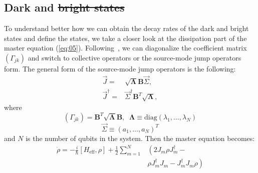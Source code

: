 \documentclass[lettersize,journal]{IEEEtran}
\providecommand{\DIFaddtex}[1]{{\protect\color{blue}\uwave{#1}}} %
\providecommand{\DIFdeltex}[1]{{\protect\color{red}\sout{#1}}}                      %
\providecommand{\DIFaddbegin}{} %
\providecommand{\DIFaddend}{} %
\providecommand{\DIFdelbegin}{} %
\providecommand{\DIFdelend}{} %
\providecommand{\DIFadd}[1]{\texorpdfstring{\DIFaddtex{#1}}{#1}} %
\providecommand{\DIFdel}[1]{\texorpdfstring{\DIFdeltex{#1}}{}} %
\newcommand{\DIFscaledelfig}{0.5}
\newlength{\DIFdelgraphicswidth} %
\newlength{\DIFdelgraphicsheight} %
\newcommand{\DIFaddincludegraphics}[2][]{{\color{blue}\fbox{\DIFOincludegraphics[#1]{#2}}}} %
\newcommand{\DIFdelincludegraphics}[2][]{%
\sbox{\DIFdelgraphicsbox}{\DIFOincludegraphics[#1]{#2}}%
\settoboxwidth{\DIFdelgraphicswidth}{\DIFdelgraphicsbox} %
\settoboxtotalheight{\DIFdelgraphicsheight}{\DIFdelgraphicsbox} %
\scalebox{\DIFscaledelfig}{%
\parbox[b]{\DIFdelgraphicswidth}{\usebox{\DIFdelgraphicsbox}\\[-\baselineskip] \rule{\DIFdelgraphicswidth}{0em}}\llap{\resizebox{\DIFdelgraphicswidth}{\DIFdelgraphicsheight}{%
\setlength{\unitlength}{\DIFdelgraphicswidth}%
\begin{picture}(1,1)%
\thicklines\linethickness{2pt} %
{\color[rgb]{1,0,0}\put(0,0){\framebox(1,1){}}}%
{\color[rgb]{1,0,0}\put(0,0){\line( 1,1){1}}}%
{\color[rgb]{1,0,0}\put(0,1){\line(1,-1){1}}}%
\end{picture}%
}\hspace*{3pt}}} %
} %
\DeclareRobustCommand{\DIFaddbegin}{\DIFOaddbegin \let\includegraphics\DIFaddincludegraphics} %
\DeclareRobustCommand{\DIFaddend}{\DIFOaddend \let\includegraphics\DIFOincludegraphics} %
\DeclareRobustCommand{\DIFdelbegin}{\DIFOdelbegin \let\includegraphics\DIFdelincludegraphics} %
\DeclareRobustCommand{\DIFdelend}{\DIFOaddend \let\includegraphics\DIFOincludegraphics} %
\begin{document}
\subsection{Dark and \DIFdelbegin \DIFdel{bright states}\DIFdelend \DIFaddbegin \DIFadd{Bright States}\DIFaddend }

To understand better how we can obtain the decay rates of the dark and bright states and define the states, we take a closer look at the dissipation part of the master equation (\ref{eq:05}).
Following~\cite{gross1982superradiance, carmichael_quantum_2000, clemens_collective_2003}, we can diagonalize the coefficient matrix $(\Gamma_{jk})$ and switch to collective operators or the source-mode jump operators form.
The general form of the source-mode jump operators is the following:
\begin{align}\label{eq:07}
    \vec{J} =& \sqrt{\mathbf{\Lambda}} \mathbf{B} \vec{\Sigma},\\
    \vec{J}^\dag =& \vec{\Sigma}^\dag \mathbf{B}^T \sqrt{\mathbf{\Lambda}},
\end{align}
where 
\begin{equation} \label{eq:08}
    \left( \Gamma_{jk} \right) = \mathbf{B}^T \sqrt{\mathbf{\Lambda}} \mathbf{B}, \;\; \mathbf{\Lambda} \equiv \mathrm{diag}(\lambda_1, \ldots, \lambda_N)
\end{equation}
\begin{equation} \label{eq:09}
    \vec{\Sigma} \equiv \left( a_1, \ldots, a_N \right)^T
\end{equation}
and $N$ is the number of qubits in the system.
Then the master equation becomes:
\begin{equation} \label{eq:10}
    \begin{aligned}
        \dot{\rho} = -\frac{i}{\hbar} \left[H_\mathrm{eff}, \rho\right] + \frac{1}{2} \sum_{m=1}^N &\left( 2 J_m \rho J_m^\dag - \right.\\
        &\left.\rho J_m^\dag J_m - J_m^\dag J_m \rho \right)
    \end{aligned}
\end{equation}
\end{document}
